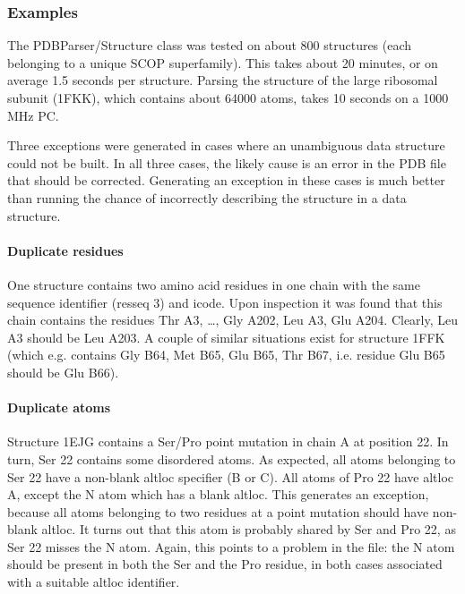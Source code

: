 \documentclass{report}
\begin{document}
\subsubsection{Examples\label{problem structures}}

The PDBParser/Structure class was tested on about 800 structures (each belonging
to a unique SCOP superfamily). This takes about 20 minutes, or on average 1.5
seconds per structure. Parsing the structure of the large ribosomal subunit
(1FKK), which contains about 64000 atoms, takes 10 seconds on a 1000 MHz PC.

Three exceptions were generated in cases where an unambiguous data structure
could not be built. In all three cases, the likely cause is an error in the
PDB file that should be corrected. Generating an exception in these cases 
is much better than running the chance of incorrectly describing
the structure in a data structure. 


\paragraph{Duplicate residues}

One structure contains two amino acid residues in one chain with the same sequence
identifier (resseq 3) and icode. Upon inspection it was found that this chain
contains the residues Thr A3, \ldots{}, Gly A202, Leu A3, Glu A204. Clearly,
Leu A3 should be Leu A203. A couple of similar situations exist for structure
1FFK (which e.g. contains Gly B64, Met B65, Glu B65, Thr B67, i.e. residue Glu
B65 should be Glu B66). 


\paragraph{Duplicate atoms}

Structure 1EJG contains a Ser/Pro point mutation in chain A at position 22.
In turn, Ser 22 contains some disordered atoms. As expected, all atoms belonging
to Ser 22 have a non-blank altloc specifier (B or C). All atoms of Pro 22 have
altloc A, except the N atom which has a blank altloc. This generates an exception,
because all atoms belonging to two residues at a point mutation should have
non-blank altloc. It turns out that this atom is probably shared by Ser and
Pro 22, as Ser 22 misses the N atom. Again, this points to a problem in the
file: the N atom should be present in both the Ser and the Pro residue, in both
cases associated with a suitable altloc identifier.
\end{document}

